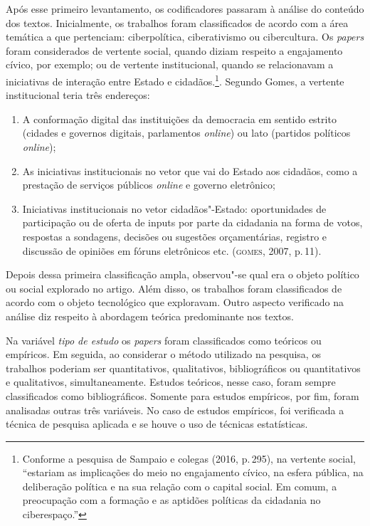 Após esse primeiro levantamento, os codificadores passaram à análise do
conteúdo dos textos. Inicialmente, os trabalhos foram classificados de
acordo com a área temática a que pertenciam: ciberpolítica,
ciberativismo ou cibercultura. Os \textit{papers} foram considerados 
de vertente social, quando diziam respeito a engajamento cívico, por
exemplo; ou de vertente institucional, quando se relacionavam a
iniciativas de interação entre Estado e cidadãos.\footnote{Conforme a
  pesquisa de Sampaio e colegas (2016, p.\,295), na vertente social,
  ``estariam as implicações do meio no engajamento cívico, na esfera
  pública, na deliberação política e na sua relação com o capital
  social. Em comum, a preocupação com a formação e as aptidões políticas
  da cidadania no ciberespaço.''}. Segundo Gomes, a vertente
  institucional teria três endereços: 

\begin{enumerate}
\item  A conformação digital das instituições da democracia em sentido estrito (cidades e governos digitais, parlamentos \textit{online}) ou lato (partidos políticos \textit{online});

\item As iniciativas institucionais no vetor que vai do Estado aos cidadãos, como a prestação de serviços públicos \textit{online} e governo eletrônico;

\item Iniciativas institucionais no vetor cidadãos"-Estado: oportunidades de participação ou de oferta de inputs por parte da cidadania na forma de votos, respostas a sondagens, decisões ou sugestões orçamentárias, registro e discussão de opiniões em fóruns eletrônicos etc. (\textsc{gomes}, 2007, p.\,11).
\end{enumerate}

Depois dessa primeira classificação ampla, observou"-se qual era o objeto
político ou social explorado no artigo. Além disso, os trabalhos foram
classificados de acordo com o objeto tecnológico que exploravam. Outro
aspecto verificado na análise diz respeito à abordagem teórica
predominante nos textos.

Na variável \textit{tipo de estudo} os \textit{papers} foram classificados como
teóricos ou empíricos. Em seguida, ao considerar o método utilizado na
pesquisa, os trabalhos poderiam ser quantitativos, qualitativos,
bibliográficos ou quantitativos e qualitativos, simultaneamente. Estudos
teóricos, nesse caso, foram sempre classificados como bibliográficos.
Somente para estudos empíricos, por fim, foram analisadas outras três
variáveis. No caso de estudos empíricos, foi verificada a técnica de
pesquisa aplicada e se houve o uso de técnicas estatísticas.

